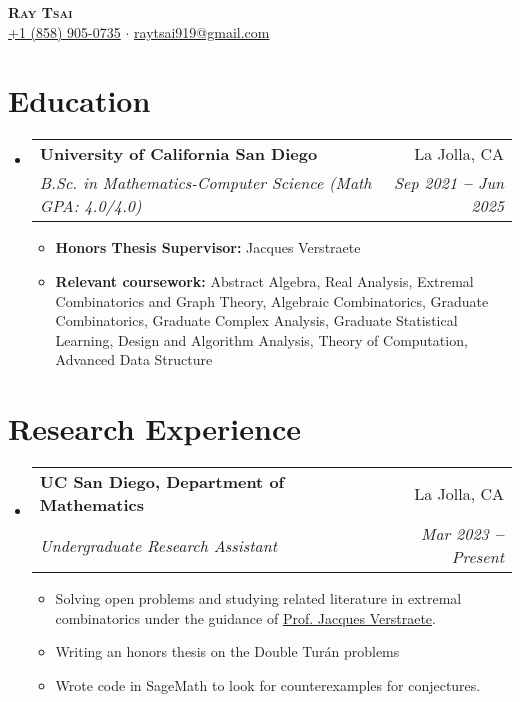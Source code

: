 \documentclass[letterpaper,11pt]{article}
\makeatletter
\newcommand{\resumeItem}[1]{
  \item\small{
    {#1 \vspace{-1pt}}
  }
}
\newcommand{\resumeSubheading}[4]{
  \vspace{-2pt}\item
    \begin{tabular*}{0.97\textwidth}[t]{l@{\extracolsep{\fill}}r}
      \textbf{#1} & #2 \\
      \textit{\small#3} & \textit{\small #4} \\
    \end{tabular*}\vspace{-2pt}
}
\newcommand{\resumeEducationHeading}[4]{
  \vspace{-2pt}\item
    \begin{tabular*}{0.97\textwidth}[t]{l@{\extracolsep{\fill}}r}
      \textbf{#1} & #2 \\
      \textit{\small#3} & \textit{\small #4} \\
    \end{tabular*}\vspace{-5pt}
}
\newcommand{\resumeSubHeadingListStart}{\begin{itemize}[leftmargin=0.15in, label={}]}
\newcommand{\resumeSubHeadingListEnd}{\end{itemize}}
\newcommand{\resumeItemListStart}{\begin{itemize}}
\newcommand{\resumeItemListEnd}{\end{itemize}\vspace{-7pt}}
\makeatother
\begin{document}

\begin{center}
    \textbf{\Huge \scshape Ray Tsai} \\ \vspace{7pt}
    \small
    \faMobile \hspace{.5pt} \href{tel:18589050735}{+1 (858) 905-0735}
    $\cdot$
    \faAt \hspace{.5pt} \href{mailto:raytsai919@gmail.com}{raytsai919@gmail.com}
\end{center}


\section{Education}
  \vspace{5pt}
  \resumeSubHeadingListStart \resumeEducationHeading {University of California San Diego }{La Jolla,
    CA} {B.Sc. in Mathematics-Computer Science (Math GPA: 4.0/4.0)}{Sep 2021 \textbf{--} Jun 2025}
    \resumeItemListStart 

    \resumeItem{\textbf{Honors Thesis Supervisor:} Jacques Verstraete} 
    
    \resumeItem{\textbf{Relevant coursework:} Abstract Algebra, Real Analysis, Extremal
    Combinatorics and Graph Theory, Algebraic Combinatorics, Graduate Combinatorics, Graduate
    Complex Analysis, Graduate Statistical Learning, Design and Algorithm Analysis, Theory of
    Computation, Advanced Data Structure} 
    \resumeItemListEnd \resumeSubHeadingListEnd


\section{Research Experience}
  \vspace{5pt}
  \resumeSubHeadingListStart
    \resumeSubheading
      {UC San Diego, Department of Mathematics}{La Jolla, CA}
      {Undergraduate Research Assistant}{Mar 2023 \textbf{--} Present}
        \resumeItemListStart
    \resumeItem{Solving open problems and studying related literature in extremal combinatorics
    under the guidance of \href{https://annatar0.wixsite.com/website-4}{Prof. Jacques Verstraete}.}
            \resumeItem{Writing an honors thesis on the Double Turán problems}
            \resumeItem{Wrote code in SageMath to look for counterexamples for conjectures.}
        \resumeItemListEnd
  \resumeSubHeadingListEnd
\end{document}

